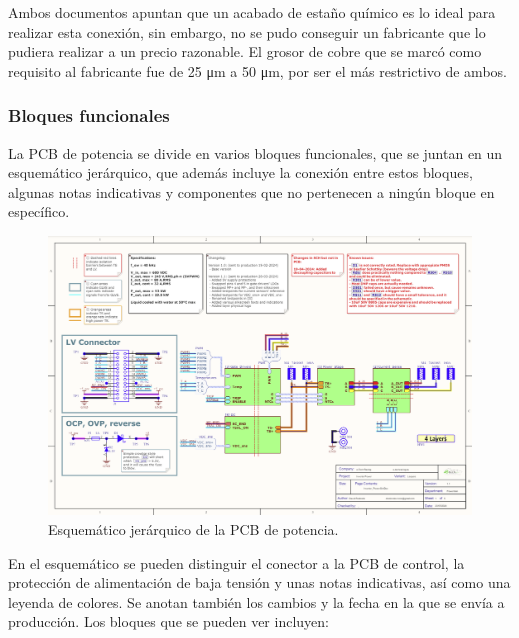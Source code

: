 Ambos documentos apuntan que un acabado de estaño químico es lo ideal para realizar esta conexión, sin embargo, no se pudo conseguir un fabricante que lo pudiera realizar a un precio razonable. El grosor de cobre que se marcó como requisito al fabricante fue de 25 \unit{\micro\meter} a 50 \unit{\micro\meter}, por ser el más restrictivo de ambos.

\subsubsection{Bloques funcionales}

La PCB de potencia se divide en varios bloques funcionales, que se juntan en un esquemático jerárquico, que además incluye la conexión entre estos bloques, algunas notas indicativas y componentes que no pertenecen a ningún bloque en específico.

\begin{figure}[H]
	\centering
	\includegraphics[width=0.8\linewidth]{fig/schPower1}
	\caption{Esquemático jerárquico de la PCB de potencia.}
\end{figure}

En el esquemático se pueden distinguir el conector a la PCB de control, la protección de alimentación de baja tensión y unas notas indicativas, así como una leyenda de colores. Se anotan también los cambios y la fecha en la que se envía a producción. Los bloques que se pueden ver incluyen:

